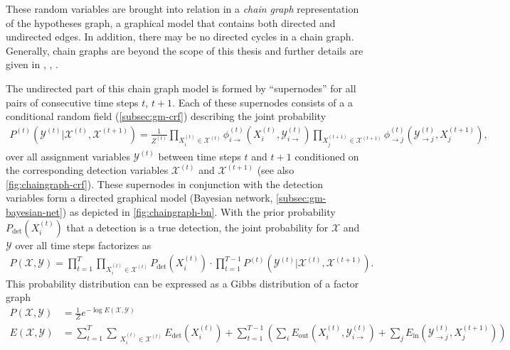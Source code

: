 These random variables are brought into relation in a \emph{chain graph} representation of the
hypotheses graph, \ie a graphical model that contains both directed and undirected edges. In
addition, there may be no directed cycles in a chain graph. Generally, chain graphs are beyond the
scope of this thesis and further details are given in \citet[][Chapter~4.1.5]{kausler_13_tracking},
\citet[][Chapter~4.6.2]{koller_09_probabilistic}, \citet{frydenberg_90_chain}.

The undirected part of this chain graph model is formed by ``supernodes'' for all pairs of
consecutive time steps $t$, $t+1$. Each of these supernodes consists of a a conditional random field
(\cref{subsec:gm-crf}) describing the joint probability
\begin{align}
    \label{eq:chaingraph-crf}
    P^{(t)}(\mathcal{Y}^{(t)}|\mathcal{X}^{(t)},\mathcal{X}^{(t+1)})= \frac{1}{Z^{(t)}} %
    \!\!\!\!\prod_{X_i^{(t)}\in\mathcal{X}^{(t)}}\!\!\!\!\!\!\!\phi^{(t)}_{i\rightarrow}(X_i^{(t)},\mathcal{Y}^{(t)}_{i\rightarrow})\!\!\!\!\!\!\!\! \prod_{X_j^{(t+1)}\in\mathcal{X}^{(t+1)}}\!\!\!\!\!\!\!\!\!\!\!\!\phi^{(t)}_{\rightarrow
        j}(\mathcal{Y}^{(t)}_{\rightarrow j},X_j^{(t+1)}),
\end{align}
over all assignment variables $\mathcal{Y}^{(t)}$ between time steps $t$ and $t+1$ conditioned on the
corresponding detection variables $\mathcal{X}^{(t)}$ and $\mathcal{X}^{(t+1)}$ (see also
\cref{fig:chaingraph-crf}). These supernodes in conjunction with the detection variables form a
directed graphical model (Bayesian network, \cref{subsec:gm-bayesian-net}) as depicted in
\cref{fig:chaingraph-bn}. With the prior probability $P_{\text{det}}(X_i^{(t)})$ that a detection is
a true detection, the joint probability for $\mathcal{X}$ and $\mathcal{Y}$ over all time steps
factorizes as
\begin{align}
\label{eq:chaingraph-prob}
P(\mathcal{X},\mathcal{Y})= 
\prod_{t=1}^T\prod_{X_i^{(t)}\in\mathcal{X}^{(t)}}\!\!\!\!\!\! P_{\mathrm{det}}(X_i^{(t)})\cdot\prod_{t=1}^{T-1}P^{(t)}(\mathcal{Y}^{(t)}|\mathcal{X}^{(t)},\mathcal{X}^{(t+1)}).
\end{align}
This probability distribution can be expressed as a Gibbs distribution of a factor graph
\begin{align}
    \label{eq:cg-gibbs}
    P(\mathcal{X},\mathcal{Y})&=\frac{1}{Z}e^{-\log E(\mathcal{X},\mathcal{Y})} \\
     E(\mathcal{X},\mathcal{Y}) &= 
     \!\sum_{t=1}^{T} \!\!\!\!\! \sum_{\ \ X_i^{(t)}\in
         \mathcal{X}^{(t)}}\!\!\!\!\!\!\!\!\!  E_{\mathrm{det}}(X_i^{(t)})+
     \sum_{t=1}^{T-1} \!\! \left( \!\! \sum_{i}E_{\mathrm{out}}(X_i^{(t)},\mathcal{Y}_{i\rightarrow}^{(t)})+ \!\!
         \sum_{j} \! E_{\mathrm{in}}(\mathcal{Y}_{\rightarrow
             j}^{(t)},X_j^{(t+1)})\!\! \right) 
\end{align}
